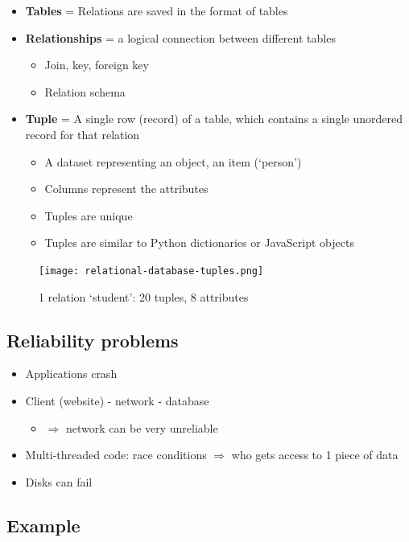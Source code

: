 \documentclass{article}
\begin{document}
\begin{itemize}
    \item \textbf{Tables} = Relations are saved in the format of tables
    \item \textbf{Relationships} = a logical connection between different tables
    \begin{itemize}
        \item Join, key, foreign key
        \item Relation schema
    \end{itemize}
    \item \textbf{Tuple} = A single row (record) of a table, which contains a single unordered record for that relation
    \begin{itemize}
        \item A dataset representing an object, an item (`person')
        \item Columns represent the attributes
        \item Tuples are unique
        \item Tuples are similar to Python dictionaries or JavaScript objects
    \end{itemize}
\end{itemize}

\begin{figure}[H]
    \centering
    \texttt{[image: relational-database-tuples.png]}
    \caption{1 relation `student': 20 tuples, 8 attributes}
\end{figure}

\subsection{Reliability problems}

\begin{itemize}
    \item Applications crash
    \item Client (website) - network - database
    \begin{itemize}
        \item $\Rightarrow$ network can be very unreliable
    \end{itemize}
    \item Multi-threaded code: race conditions $\Rightarrow$ who gets access to 1 piece of data
    \item Disks can fail
\end{itemize}

\subsection{Example}
\end{document}
